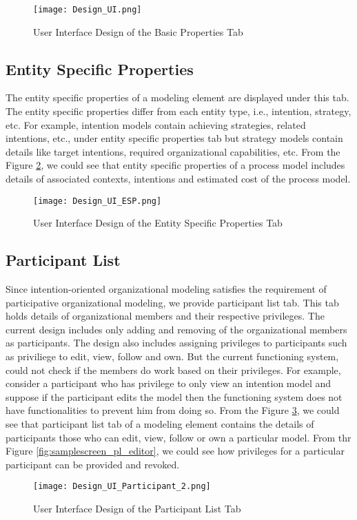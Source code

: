 \begin{figure}[H]
	\centering
	\texttt{[image: Design\_UI.png]}
	\caption{User Interface Design of the Basic Properties Tab}
	\label{fig:samplescreen}
\end{figure}

\subsection{Entity Specific Properties}
The entity specific properties of a modeling element are displayed under this tab. The entity specific properties differ from each entity type, i.e., intention, strategy, etc. For example, intention models contain achieving strategies, related intentions, etc., under entity specific properties tab but strategy models contain details like target intentions, required organizational capabilities, etc. From the Figure \ref{fig:samplescreen_esp}, we could see that entity specific properties of a process model includes details of associated contexts, intentions and estimated cost of the process model.

\begin{figure} [H]
	\centering
	\texttt{[image: Design\_UI\_ESP.png]}
	\caption{User Interface Design of the Entity Specific Properties Tab}
	\label{fig:samplescreen_esp}
\end{figure}

\subsection{Participant List}
Since intention-oriented organizational modeling satisfies the requirement of participative organizational modeling, we provide participant list tab. This tab holds details of organizational members and their respective privileges. The current design includes only adding and removing of the organizational members as participants. The design also includes assigning privileges to participants such as priviliege to edit, view, follow and own. But the current functioning system, could not check if the members do work based on their privileges. For example, consider a participant who has privilege to only view an intention model and suppose if the participant edits the model then the functioning system does not have functionalities to prevent him from doing so. From the Figure \ref{fig:samplescreen_pl}, we could see that participant list tab of a modeling element contains the details of participants those who can edit, view, follow or own a particular model. 
From thr Figure \ref{fig:samplescreen_pl_editor}, we could see how privileges for a particular participant can be provided and revoked.  
\begin{figure} [H]
	\centering
	\texttt{[image: Design\_UI\_Participant\_2.png]}
	\caption{User Interface Design of the Participant List Tab}
	\label{fig:samplescreen_pl}
\end{figure}


